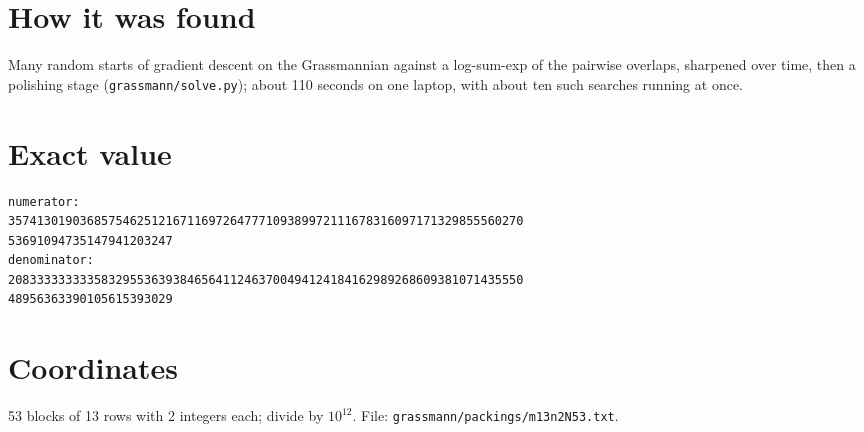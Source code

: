 \documentclass[11pt,a4paper]{article}
\begin{document}
\section{How it was found}
Many random starts of gradient descent on the Grassmannian against a log-sum-exp of the pairwise overlaps, sharpened over time, then a polishing stage (\texttt{grassmann/solve.py}); about 110 seconds on one laptop, with about ten such searches running at once.


\appendix
\section{Exact value}
{\small
\begin{verbatim}
numerator:
357413019036857546251216711697264777109389972111678316097171329855560270
53691094735147941203247
denominator:
208333333333583295536393846564112463700494124184162989268609381071435550
48956363390105615393029
\end{verbatim}}

\section{Coordinates}
53 blocks of 13 rows with 2 integers each; divide by $10^{12}$. File: \texttt{grassmann/packings/m13n2N53.txt}.
{\tiny
\begin{multicols}{4}
\end{multicols}}
\end{document}
